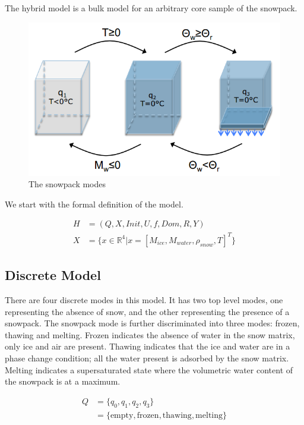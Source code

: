 \documentclass{article}
\begin{document}
The hybrid model is a bulk model for an arbitrary core
sample of the snowpack.

\begin{figure}[h!]
\centering
\includegraphics[scale=0.7]{discrete_modes.png}
\caption{The snowpack modes}
\label{fig:snowpack-modes}
\end{figure}

We start with the formal definition of the model.

\begin{align}
H &= (Q, X, Init, U, f, Dom, R, Y) \\
X &= \{x \in \mathbb{R}^4 \big| x = \left[ M_{ice}, M_{water}, \rho_{snow}, T \right]^T\}
\end{align}

\subsection{Discrete Model}

There are four discrete modes in this model.
It has two top level modes, one representing the absence
of snow, and the other representing the presence of a snowpack.
The snowpack mode is further discriminated into three modes:
frozen, thawing and melting.
Frozen indicates the absence of water in the snow matrix,
only ice and air are present.
Thawing indicates that the ice and water are in a phase change condition;
all the water present is adsorbed by the snow matrix.
Melting indicates a supersaturated state where the
volumetric water content of the snowpack is at a maximum.

\begin{align}
Q &= \{q_0, q_1, q_2, q_3\} \\
  &= \{\text{empty}, \text{frozen}, \text{thawing}, \text{melting}\}
\end{align}
\end{document}
